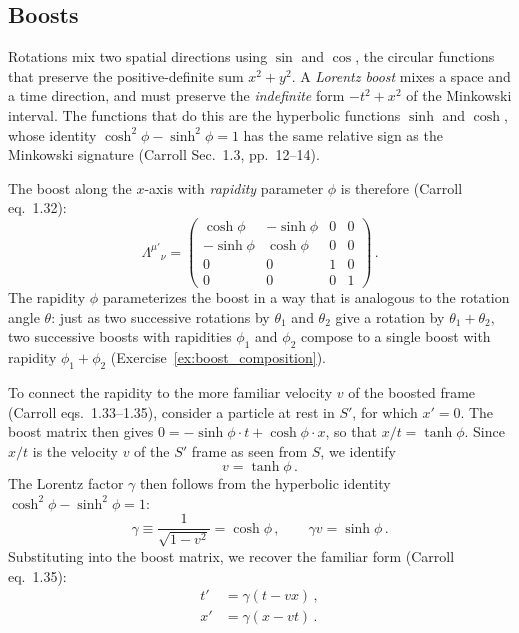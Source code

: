 \subsection{Boosts}

Rotations mix two spatial directions using $\sin$ and $\cos$, the circular
functions that preserve the positive-definite sum $x^2 + y^2$.
A \emph{Lorentz boost} mixes a space and a time direction, and must
preserve the \emph{indefinite} form $-t^2 + x^2$ of the Minkowski
interval.  The functions that do this are the hyperbolic functions
$\sinh$ and $\cosh$, whose identity
$\cosh^2\phi - \sinh^2\phi = 1$ has the same relative sign as the Minkowski
signature (Carroll Sec.~1.3, pp.~12--14).

The boost along the $x$-axis with \emph{rapidity} parameter $\phi$ is
therefore (Carroll eq.~1.32):
\begin{equation}
    \Lambda^{\mu'}{}_\nu =
    \begin{pmatrix}
    \cosh\phi & -\sinh\phi & 0 & 0 \\
    -\sinh\phi & \cosh\phi & 0 & 0 \\
    0 & 0 & 1 & 0 \\
    0 & 0 & 0 & 1
    \end{pmatrix} \,.
    \label{eq:boost_rapidity}
\end{equation}
The rapidity $\phi$ parameterizes the boost in a way that is analogous
to the rotation angle $\theta$: just as two successive rotations by
$\theta_1$ and $\theta_2$ give a rotation by $\theta_1 + \theta_2$,
two successive boosts with rapidities $\phi_1$ and $\phi_2$ compose
to a single boost with rapidity $\phi_1 + \phi_2$ (Exercise~\ref{ex:boost_composition}).

To connect the rapidity to the more familiar velocity $v$ of the boosted frame
(Carroll eqs.~1.33--1.35), consider a particle at rest in $S'$, for which
$x' = 0$.  The boost matrix then gives
$0 = -\sinh\phi \cdot t + \cosh\phi \cdot x$, so that
$x/t = \tanh\phi$.  Since $x/t$ is the velocity $v$ of the $S'$
frame as seen from $S$, we identify
\begin{equation}
    v = \tanh\phi \,.
    \label{eq:rapidity_velocity}
\end{equation}
The Lorentz factor $\gamma$ then follows from the hyperbolic identity
$\cosh^2\phi - \sinh^2\phi = 1$:
\begin{equation}
    \gamma \equiv \frac{1}{\sqrt{1 - v^2}} = \cosh\phi \,, \qquad
    \gamma v = \sinh\phi \,.
    \label{eq:gamma_def}
\end{equation}
Substituting into the boost matrix, we recover the familiar form
(Carroll eq.~1.35):
\begin{align}
    t' &= \gamma(t - vx) \,, \nonumber \\
    x' &= \gamma(x - vt) \,.
    \label{eq:boost_velocity}
\end{align}

